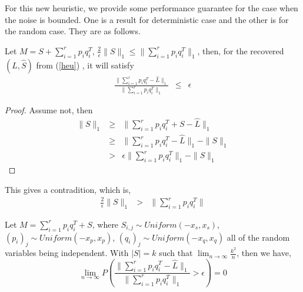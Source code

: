 For this new heuristic, we provide some performance guarantee for the case
when the noise is bounded. One is a result for deterministic case
and the other is for the random case. They are as follows.
\begin{prop}
Let $M=S+\sum_{i=1}^{r}p_{i}q_{i}^{T}$, $\frac{2}{\epsilon}\|S\|_{1}\le\|\sum_{i=1}^{r}p_{i}q_{i}^{T}\|_{1}$,
then, for the recovered $(\hat{L},\hat{S})$ from (\ref{heu}) , it
will satisfy
\begin{eqnarray*}
\frac{\|\sum_{i=1}^{r}p_{i}q_{i}^{T}-\hat{L}\|_{1}}{\|\sum_{i=1}^{r}p_{i}q_{i}^{T}\|_{1}} & \le & \epsilon
\end{eqnarray*}
\end{prop}
\begin{proof}
Assume not, then
\begin{eqnarray*}
\|S\|_{1} & \ge & \|\sum_{i=1}^{r}p_{i}q_{i}^{T}+S-\hat{L}\|_{1}\\
 & \ge & \|\sum_{i=1}^{r}p_{i}q_{i}^{T}-\hat{L}\|_{1}-\|S\|_{1}\\
 & > & \epsilon\|\sum_{i=1}^{r}p_{i}q_{i}^{T}\|_{1}-\|S\|_{1}
\end{eqnarray*}

\end{proof}
This gives a contradition, which is,
\begin{eqnarray*}
\frac{2}{\epsilon}\|S\|_{1} & > & \|\sum_{i=1}^{r}p_{i}q_{i}^{T}\|
\end{eqnarray*}

\begin{prop}
Let $M=\sum_{i=1}^{r}p_{i}q_{i}^{T}+S$, where $S_{i,j}\sim Uniform(-x_{s},x_{s})$,
$(p_{i})_{j}\sim Uniform(-x_{p},x_{p})$, $(q_{i})_{j}\sim Uniform(-x_{q},x_{q})$
all of the random variables being independent. With $|S|=k$ such that
$\lim_{n\to\infty}\frac{k^{2}}{n}$, then we have,
\[
\lim_{n \to \infty} P \left( \frac{ \|\sum_{i=1}^{r} p_{i} q_{i}^{T} - \hat{L} \|_{1} }{ \| \sum_{i=1}^{r} p_{i} q_{i}^{T} \|_{1} } > \epsilon \right) = 0
\]
\end{prop}

